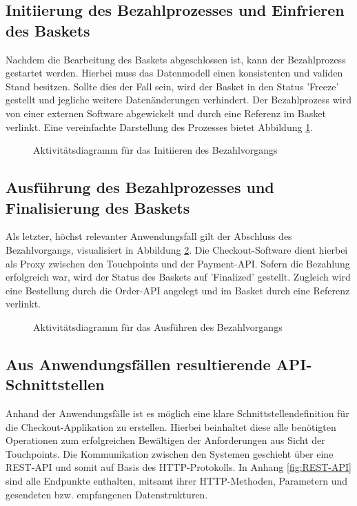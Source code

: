 \subsection{Initiierung des Bezahlprozesses und Einfrieren des Baskets}

Nachdem die Bearbeitung des Baskets abgeschlossen ist, kann der Bezahlprozess gestartet werden. Hierbei muss das Datenmodell einen konsistenten und validen Stand besitzen. Sollte dies der Fall sein, wird der Basket in den Status 'Freeze' gestellt und jegliche weitere Datenänderungen verhindert. Der Bezahlprozess wird von einer externen Software abgewickelt und durch eine Referenz im Basket verlinkt. Eine vereinfachte Darstellung des Prozesses bietet Abbildung \ref{fig:SL-InitPayment}.

\begin{figure}[H]
	\centering
	
	\caption{Aktivitätsdiagramm für das Initiieren des Bezahlvorgangs }
	\label{fig:SL-InitPayment}
\end{figure}

\pagebreak

\subsection{Ausführung des Bezahlprozesses und Finalisierung des Baskets}

Als letzter, höchst relevanter Anwendungsfall gilt der Abschluss des Bezahlvorgangs, visualisiert in Abbildung \ref{fig:SL-ExecPayment}. Die Checkout-Software dient hierbei als Proxy zwischen den Touchpoints und der Payment-API. Sofern die Bezahlung erfolgreich war, wird der Status des Baskets auf 'Finalized' gestellt. Zugleich wird eine Bestellung durch die Order-API angelegt und im Basket durch eine Referenz verlinkt.

\begin{figure}[H]
	\centering
	
	\caption{Aktivitätsdiagramm für das Ausführen des Bezahlvorgangs }
	\label{fig:SL-ExecPayment}
\end{figure}

\subsection{Aus Anwendungsfällen resultierende API-Schnittstellen }

Anhand der Anwendungsfälle ist es möglich eine klare Schnittstellendefinition für die Checkout-Applikation zu erstellen. Hierbei beinhaltet diese alle benötigten Operationen zum erfolgreichen Bewältigen der Anforderungen aus Sicht der Touchpoints. Die Kommunikation zwischen den Systemen geschieht über eine \acrshort{REST}-API und somit auf Basis des \acrshort{HTTP}-Protokolls. In Anhang \ref{fig:REST-API} sind alle Endpunkte enthalten, mitsamt ihrer HTTP-Methoden, Parametern und gesendeten bzw. empfangenen Datenstrukturen.

